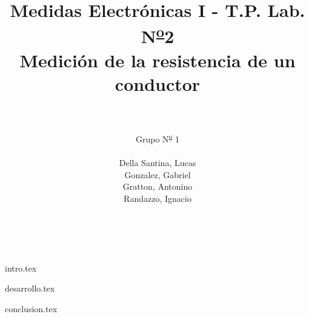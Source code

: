 

\title{ Medidas Electrónicas I - T.P. Lab. N\textsuperscript{\underline{o}}2\\
        Medición de la resistencia de un conductor  
      }
\author{
        \\~\\
        Grupo N\textsuperscript{\underline{o}} 1 
        \\~\\
        Della Santina, Lucas \\
        Gonzalez, Gabriel \\
        Gratton, Antonino \\
        Randazzo, Ignacio\\
        \\~\\
        }


\maketitle
\tableofcontents

{intro.tex}

{desarrollo.tex}

{conclusion.tex}


